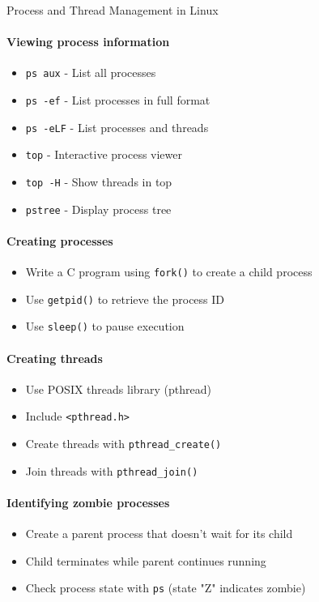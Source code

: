\begin{KR}{Process and Thread Management in Linux}\\
    \paragraph{Viewing process information}
    \begin{itemize}
        \item \texttt{ps aux} - List all processes
        \item \texttt{ps -ef} - List processes in full format
        \item \texttt{ps -eLF} - List processes and threads
        \item \texttt{top} - Interactive process viewer
        \item \texttt{top -H} - Show threads in top
        \item \texttt{pstree} - Display process tree
    \end{itemize}
    
    \paragraph{Creating processes}
    \begin{itemize}
        \item Write a C program using \texttt{fork()} to create a child process
        \item Use \texttt{getpid()} to retrieve the process ID
        \item Use \texttt{sleep()} to pause execution
    \end{itemize}
    
    \paragraph{Creating threads}
    \begin{itemize}
        \item Use POSIX threads library (pthread)
        \item Include \texttt{<pthread.h>}
        \item Create threads with \texttt{pthread\_create()}
        \item Join threads with \texttt{pthread\_join()}
    \end{itemize}
    
    \paragraph{Identifying zombie processes}
    \begin{itemize}
        \item Create a parent process that doesn't wait for its child
        \item Child terminates while parent continues running
        \item Check process state with \texttt{ps} (state "Z" indicates zombie)
    \end{itemize}
\end{KR}

